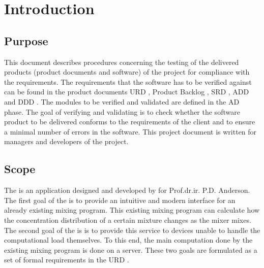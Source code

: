 \chapter{Introduction}

\section{Purpose}
   This document describes procedures concerning the testing of the delivered products (product
   documents and software) of the \projectname{} project for compliance with the requirements. The
   requirements that the software has to be verified against can be found in the product documents
   URD \cite{urd}, Product Backlog \cite{backlog}, SRD \cite{srd}, ADD \cite{add} and DDD \cite{ddd}. The modules to be verified and validated are defined
   in the AD phase. The goal of verifying and validating is to check whether the software product to
   be delivered conforms to the requirements of the client and to ensure a minimal number of errors
   in the software. This project document is written for managers and developers of the \projectname{}
   project.

\section{Scope}
The \applicationname{} is an application designed and developed by \projectauthor{} for Prof.dr.ir. P.D. Anderson. The first goal of the \applicationname{} is to provide an intuitive and modern interface for an already existing mixing program. This existing mixing program can calculate how the concentration distribution of a certain mixture changes as the mixer mixes. The second goal of the \applicationname{} is is to provide this service to devices unable to handle the computational load themselves. To this end, the main computation done by the existing mixing program is done on a server. These two goals are formulated as a set of formal requirements in the  URD \cite{urd}.

